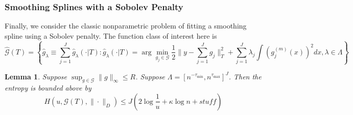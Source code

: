 \documentclass[12pt]{article}
\newtheorem{lemma}{Lemma}
\begin{document}
\subsubsection{Smoothing Splines with a Sobolev Penalty}

Finally, we consider the classic nonparametric problem of fitting a smoothing spline using a Sobolev penalty. The function class of interest here is
\[
\hat{\mathcal{G}}(T)=\left\{\hat{g}_\lambda \equiv \sum_{j=1}^J \hat{g}_{\lambda}(\cdot|T) :  \hat{g}_{\lambda}(\cdot|T)=\arg\min_{g_j\in\mathcal{G}}\frac{1}{2}\|y- \sum_{j=1}^J g_j\|_{T}^{2}+ \sum_{j=1}^J \lambda_j \int (g_j^{(m)}(x))^2 dx , \lambda\in\Lambda\right\} 
\]

\begin{lemma}
Suppose $\sup_{g \in \mathcal{G}} \|g\|_\infty \le R$.
Suppose $\Lambda = [n^{- \tau_{\min}} , n^{\tau_{\max}}]^J$. 
Then the entropy is bounded above by
\begin{equation}
H \left ( u, \mathcal{G}(T), \| \cdot \|_D \right ) \le J \left ( 2 \log \frac{1}{u} + \kappa \log n + stuff \right )
\end{equation}
\end{lemma}
\end{document}
